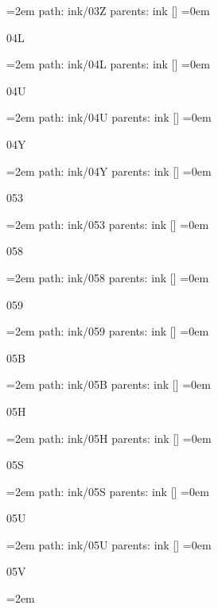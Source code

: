 \leftskip=2em
path: ink/03Z
\smallskip
parents:  ink []
\smallskip
\leftskip=0em
\par\endgroup
\bigskip
{}
04L
\smallskip
\par\begingroup
\leftskip=2em
path: ink/04L
\smallskip
parents:  ink []
\smallskip
\leftskip=0em
\par\endgroup
\bigskip
{}
04U
\smallskip
\par\begingroup
\leftskip=2em
path: ink/04U
\smallskip
parents:  ink []
\smallskip
\leftskip=0em
\par\endgroup
\bigskip
{}
04Y
\smallskip
\par\begingroup
\leftskip=2em
path: ink/04Y
\smallskip
parents:  ink []
\smallskip
\leftskip=0em
\par\endgroup
\bigskip
{}
053
\smallskip
\par\begingroup
\leftskip=2em
path: ink/053
\smallskip
parents:  ink []
\smallskip
\leftskip=0em
\par\endgroup
\bigskip
{}
058
\smallskip
\par\begingroup
\leftskip=2em
path: ink/058
\smallskip
parents:  ink []
\smallskip
\leftskip=0em
\par\endgroup
\bigskip
{}
059
\smallskip
\par\begingroup
\leftskip=2em
path: ink/059
\smallskip
parents:  ink []
\smallskip
\leftskip=0em
\par\endgroup
\bigskip
{}
05B
\smallskip
\par\begingroup
\leftskip=2em
path: ink/05B
\smallskip
parents:  ink []
\smallskip
\leftskip=0em
\par\endgroup
\bigskip
{}
05H
\smallskip
\par\begingroup
\leftskip=2em
path: ink/05H
\smallskip
parents:  ink []
\smallskip
\leftskip=0em
\par\endgroup
\bigskip
{}
05S
\smallskip
\par\begingroup
\leftskip=2em
path: ink/05S
\smallskip
parents:  ink []
\smallskip
\leftskip=0em
\par\endgroup
\bigskip
{}
05U
\smallskip
\par\begingroup
\leftskip=2em
path: ink/05U
\smallskip
parents:  ink []
\smallskip
\leftskip=0em
\par\endgroup
\bigskip
{}
05V
\smallskip
\par\begingroup
\leftskip=2em
